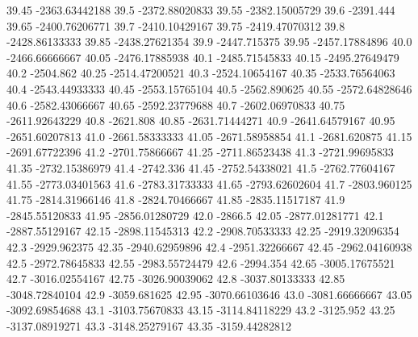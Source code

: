           39.45   -2363.63442188
           39.5   -2372.88020833
          39.55   -2382.15005729
           39.6        -2391.444
          39.65   -2400.76206771
           39.7   -2410.10429167
          39.75   -2419.47070312
           39.8   -2428.86133333
          39.85   -2438.27621354
           39.9     -2447.715375
          39.95   -2457.17884896
           40.0   -2466.66666667
          40.05   -2476.17885938
           40.1   -2485.71545833
          40.15   -2495.27649479
           40.2        -2504.862
          40.25   -2514.47200521
           40.3   -2524.10654167
          40.35   -2533.76564063
           40.4   -2543.44933333
          40.45   -2553.15765104
           40.5     -2562.890625
          40.55   -2572.64828646
           40.6   -2582.43066667
          40.65   -2592.23779688
           40.7   -2602.06970833
          40.75   -2611.92643229
           40.8        -2621.808
          40.85   -2631.71444271
           40.9   -2641.64579167
          40.95   -2651.60207813
           41.0   -2661.58333333
          41.05   -2671.58958854
           41.1     -2681.620875
          41.15   -2691.67722396
           41.2   -2701.75866667
          41.25   -2711.86523438
           41.3   -2721.99695833
          41.35   -2732.15386979
           41.4        -2742.336
          41.45   -2752.54338021
           41.5   -2762.77604167
          41.55   -2773.03401563
           41.6   -2783.31733333
          41.65   -2793.62602604
           41.7     -2803.960125
          41.75   -2814.31966146
           41.8   -2824.70466667
          41.85   -2835.11517187
           41.9   -2845.55120833
          41.95   -2856.01280729
           42.0          -2866.5
          42.05   -2877.01281771
           42.1   -2887.55129167
          42.15   -2898.11545313
           42.2   -2908.70533333
          42.25   -2919.32096354
           42.3     -2929.962375
          42.35   -2940.62959896
           42.4   -2951.32266667
          42.45   -2962.04160938
           42.5   -2972.78645833
          42.55   -2983.55724479
           42.6        -2994.354
          42.65   -3005.17675521
           42.7   -3016.02554167
          42.75   -3026.90039062
           42.8   -3037.80133333
          42.85   -3048.72840104
           42.9     -3059.681625
          42.95   -3070.66103646
           43.0   -3081.66666667
          43.05   -3092.69854688
           43.1   -3103.75670833
          43.15   -3114.84118229
           43.2        -3125.952
          43.25   -3137.08919271
           43.3   -3148.25279167
          43.35   -3159.44282812
